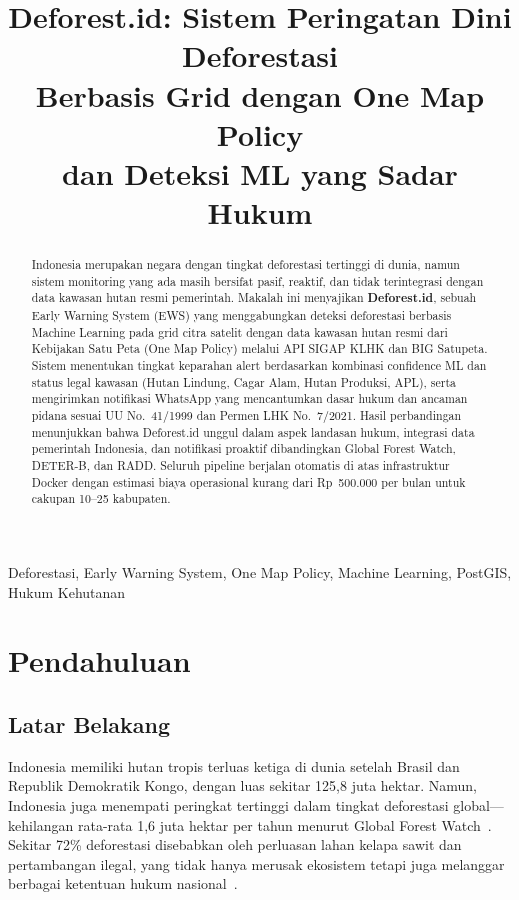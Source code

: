 \documentclass[10pt,conference,a4paper]{IEEEtran}
\title{\textbf{Deforest.id}: Sistem Peringatan Dini Deforestasi\\Berbasis Grid dengan One Map Policy\\dan Deteksi ML yang Sadar Hukum}
\author{
    \IEEEauthorblockN{[Nama Tim / Penulis]}
    \IEEEauthorblockA{\textit{[Institusi]}\\
        [Email], [GitHub]}
}
\begin{document}
\maketitle

\begin{abstract}
Indonesia merupakan negara dengan tingkat deforestasi tertinggi di dunia,
namun sistem monitoring yang ada masih bersifat pasif, reaktif, dan tidak
terintegrasi dengan data kawasan hutan resmi pemerintah. Makalah ini
menyajikan \textbf{Deforest.id}, sebuah Early Warning System (EWS) yang
menggabungkan deteksi deforestasi berbasis Machine Learning pada grid
citra satelit dengan data kawasan hutan resmi dari Kebijakan Satu Peta
(One Map Policy) melalui API SIGAP KLHK dan BIG Satupeta. Sistem
menentukan tingkat keparahan alert berdasarkan kombinasi confidence ML
dan status legal kawasan (Hutan Lindung, Cagar Alam, Hutan Produksi,
APL), serta mengirimkan notifikasi WhatsApp yang mencantumkan dasar
hukum dan ancaman pidana sesuai UU No.~41/1999 dan Permen LHK No.~7/2021.
Hasil perbandingan menunjukkan bahwa Deforest.id unggul dalam aspek
landasan hukum, integrasi data pemerintah Indonesia, dan notifikasi
proaktif dibandingkan Global Forest Watch, DETER-B, dan RADD.
Seluruh pipeline berjalan otomatis di atas infrastruktur Docker dengan
estimasi biaya operasional kurang dari Rp~500.000 per bulan untuk
cakupan 10--25 kabupaten.
\end{abstract}

\begin{IEEEkeywords}
Deforestasi, Early Warning System, One Map Policy, Machine Learning,
PostGIS, Hukum Kehutanan
\end{IEEEkeywords}

\section{Pendahuluan}

\subsection{Latar Belakang}

Indonesia memiliki hutan tropis terluas ketiga di dunia setelah Brasil
dan Republik Demokratik Kongo, dengan luas sekitar 125,8 juta hektar.
Namun, Indonesia juga menempati peringkat tertinggi dalam tingkat
deforestasi global---kehilangan rata-rata 1,6 juta hektar per tahun
menurut Global Forest Watch~\cite{gfw2023}. Sekitar 72\% deforestasi
disebabkan oleh perluasan lahan kelapa sawit dan pertambangan ilegal,
yang tidak hanya merusak ekosistem tetapi juga melanggar berbagai
ketentuan hukum nasional~\cite{uu41}.
\end{document}

